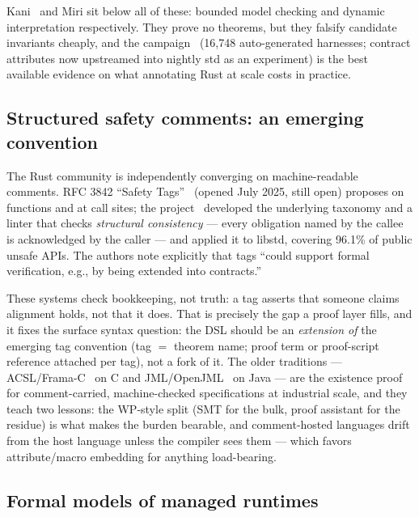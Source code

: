 Kani~\cite{kani2026} and Miri sit below all of these: bounded model
checking and dynamic interpretation respectively. They prove no theorems,
but they falsify candidate invariants cheaply, and the
 campaign~\cite{verifyruststd2025} (16{,}748
auto-generated harnesses; contract attributes now upstreamed into nightly
std as an experiment) is the best available evidence on what annotating
 Rust at scale costs in practice.

\subsection{Structured safety comments: an emerging convention}
\label{sec:prior-tags}

The Rust community is independently converging on machine-readable
\safetyc{} comments. RFC 3842 ``Safety Tags''~\cite{rfc3842} (opened July
2025, still open) proposes  on
 functions and  at call
sites; the  project~\cite{tagstd2025} developed the
underlying taxonomy and a linter that checks \emph{structural consistency}
--- every obligation named by the callee is acknowledged by the caller ---
and applied it to libstd, covering 96.1\% of public unsafe APIs. The
authors note explicitly that tags ``could support formal verification,
e.g., by being extended into contracts.''

These systems check bookkeeping, not truth: a tag asserts that someone
claims alignment holds, not that it does. That is precisely the gap a
proof layer fills, and it fixes the surface syntax question: the DSL
should be an \emph{extension of} the emerging tag convention (tag $=$
theorem name; proof term or proof-script reference attached per tag), not
a fork of it. The older traditions --- ACSL/Frama-C~\cite{acsl} on C and
JML/OpenJML~\cite{openjml} on Java --- are the existence proof for
comment-carried, machine-checked specifications at industrial scale, and
they teach two lessons: the WP-style split (SMT for the bulk, proof
assistant for the residue) is what makes the burden bearable, and
comment-hosted languages drift from the host language unless the
compiler sees them --- which favors attribute/macro embedding for anything
load-bearing.

\subsection{Formal models of managed runtimes}
\label{sec:prior-clr}

